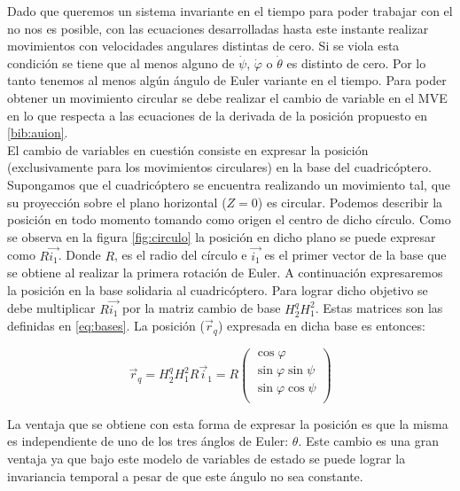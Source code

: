 \documentclass[main]{subfiles}
\begin{document}
Dado que queremos un sistema invariante en el tiempo para poder trabajar con el no nos es posible, con las ecuaciones desarrolladas hasta este instante realizar movimientos con velocidades angulares distintas de cero. Si se viola esta condici\'on se tiene que al menos alguno de $\dot{\psi}$, $\dot{\varphi}$ o $\dot{\theta}$ es distinto de cero. Por lo tanto tenemos al menos alg\'un \'angulo de Euler variante en el tiempo. Para poder obtener un movimiento circular se debe realizar el cambio de variable en el MVE en lo que respecta a las ecuaciones de la derivada de la posici\'on propuesto en \ref{bib:auion}. \\
El cambio de variables en cuesti\'on consiste en expresar la posici\'on (exclusivamente para los movimientos circulares) en la base del cuadric\'optero. Supongamos que el cuadric\'optero se encuentra realizando un movimiento tal, que su proyecci\'on sobre el plano horizontal ($Z=0$) es circular. Podemos describir la posici\'on en todo momento tomando como origen el centro de dicho c\'irculo. Como se observa en la figura \ref{fig:circulo} la posici\'on en dicho plano se puede expresar como $R\vec{i_1}$. Donde $R$, es el radio del c\'irculo e $\vec{i_1}$ es el primer vector de la base que se obtiene al realizar la primera rotaci\'on de Euler. A continuaci\'on expresaremos la posici\'on en la base solidaria al cuadric\'optero. Para lograr dicho objetivo se debe multiplicar $R\vec{i_1}$ por la matriz cambio de base $H_2^qH_1^2$. Estas matrices son las definidas en \ref{eq:bases}. La posici\'on ($\vec{r}_q$) expresada en dicha base es entonces:

\begin{equation}
\label{eq:pos_circ}
\vec{r}_q=H_2^qH_1^2R\vec{i}_1=R\left(\begin{array}{c}
\cos\varphi\\
\sin\varphi\sin\psi\\
\sin\varphi\cos\psi\\
\end{array}\right)
\end{equation}

La ventaja que se obtiene con esta forma de expresar la posici\'on es que la misma es independiente de uno de los tres \'anglos de Euler: $\theta$. Este cambio es una gran ventaja ya que bajo este modelo de variables de estado se puede lograr la invariancia temporal a pesar de que este \'angulo no sea constante. \\
\end{document}
